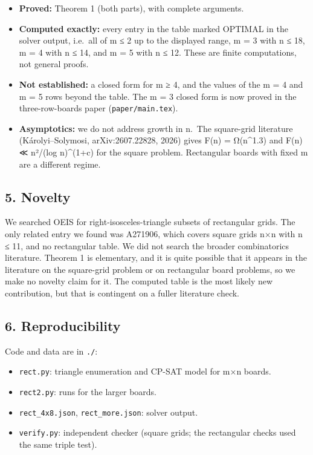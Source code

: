 \documentclass[
  11pt,
]{article}
\providecommand{\tightlist}{%
  \setlength{\itemsep}{0pt}\setlength{\parskip}{0pt}}
\begin{document}
\begin{itemize}
\tightlist
\item
  \textbf{Proved:} Theorem 1 (both parts), with complete arguments.
\item
  \textbf{Computed exactly:} every entry in the table marked OPTIMAL in
  the solver output, i.e.~all of m ≤ 2 up to the displayed range, m = 3
  with n ≤ 18, m = 4 with n ≤ 14, and m = 5 with n ≤ 12. These are
  finite computations, not general proofs.
\item
  \textbf{Not established:} a closed form for m ≥ 4, and the values of
  the m = 4 and m = 5 rows beyond the table. The m = 3 closed form is
  now proved in the three-row-boards paper (\texttt{paper/main.tex}).
\item
  \textbf{Asymptotics:} we do not address growth in n.~The square-grid
  literature (Károlyi--Solymosi, arXiv:2607.22828, 2026) gives F(n) =
  Ω(n\^{}1.3) and F(n) ≪ n²/(log n)\^{}(1+c) for the square problem.
  Rectangular boards with fixed m are a different regime.
\end{itemize}

\subsection{5. Novelty}\label{novelty}

We searched OEIS for right-isosceles-triangle subsets of rectangular
grids. The only related entry we found was A271906, which covers square
grids n×n with n ≤ 11, and no rectangular table. We did not search the
broader combinatorics literature. Theorem 1 is elementary, and it is
quite possible that it appears in the literature on the square-grid
problem or on rectangular board problems, so we make no novelty claim
for it. The computed table is the most likely new contribution, but that
is contingent on a fuller literature check.

\subsection{6. Reproducibility}\label{reproducibility}

Code and data are in \texttt{./}:

\begin{itemize}
\tightlist
\item
  \texttt{rect.py}: triangle enumeration and CP-SAT model for m×n
  boards.
\item
  \texttt{rect2.py}: runs for the larger boards.
\item
  \texttt{rect\_4x8.json}, \texttt{rect\_more.json}: solver output.
\item
  \texttt{verify.py}: independent checker (square grids; the rectangular
  checks used the same triple test).
\end{itemize}
\end{document}
